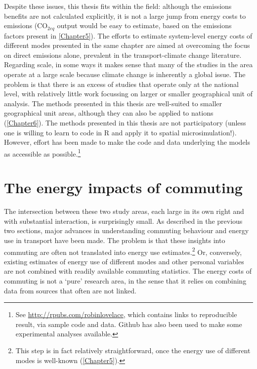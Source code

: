 Despite these issues, this thesis fits within the field: although the emissions
benefits are not calculated explicitly, it is not a large jump from energy
costs to emissions (CO$_{2eq}$ output
would be easy to estimate, based on the
emissions factors present in \cref{Chapter5}). The efforts to estimate
system-level energy costs of different modes presented in the same chapter
are aimed at overcoming the focus on direct emissions alone, prevalent in the
transport-climate change literature. Regarding scale, in some ways it makes
sense that many of the studies in the area operate at a large scale
because climate change is inherently a global issue.
The problem is that there is an excess of studies that operate only at the
national level, with relatively little work focussing on larger or smaller geographical
unit of analysis. The methods
presented in this thesis are well-suited to smaller geographical unit areas, although
they can also be applied to nations (\cref{Chapter6}).
The methods presented in this thesis are not participatory (unless one is
willing to learn to code in R and apply it to spatial microsimulation!).
However, effort has been made to make the code and data underlying the
models as accessible as possible.\footnote{See
\url{http://rpubs.com/robinlovelace}, which contains links to
reproducible result, via sample code and data. Github has also
been used to make some experimental analyses available.
}


\section{The energy impacts of commuting} \label{sdisciplines}
The intersection between these two study areas, each large in its own
right and with substantial interaction, is surprisingly small.
As described in the previous two sections, major advances in understanding
commuting behaviour and energy use in transport have been made.
The problem is that these insights into commuting are often not
translated into energy use
estimates.\footnote{This step is in fact
relatively straightforward, once the energy use of different modes is well-known
(\cref{Chapter5}).
}
Or, conversely, existing estimates of energy use of different modes and
other personal variables are not combined with readily available
commuting statistics. The energy costs of commuting is not a
`pure' research area, in the sense that it relies on combining data from
sources that often are not linked.

